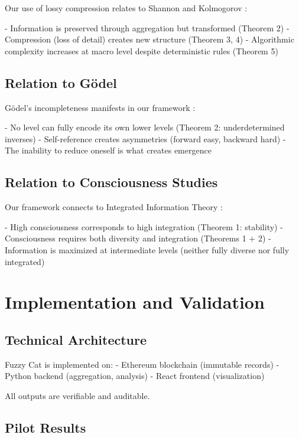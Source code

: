 \documentclass[12pt,a4paper]{article}
\theoremstyle{definition}
\begin{document}
{Our use of lossy compression relates to Shannon and Kolmogorov \citep{shannon1948mathematical, kolmogorov1965three}:

- Information is preserved through aggregation but transformed (Theorem 2)
- Compression (loss of detail) creates new structure (Theorem 3, 4)
- Algorithmic complexity increases at macro level despite deterministic rules (Theorem 5)

\subsection{Relation to Gödel}

Gödel's incompleteness manifests in our framework \citep{godel1931}:

- No level can fully encode its own lower levels (Theorem 2: underdetermined inverses)
- Self-reference creates asymmetries (forward easy, backward hard)
- The inability to reduce oneself is what creates emergence

\subsection{Relation to Consciousness Studies}

Our framework connects to Integrated Information Theory \citep{tononi2012integrated}:

- High consciousness corresponds to high integration (Theorem 1: stability)
- Consciousness requires both diversity and integration (Theorems 1 + 2)
- Information is maximized at intermediate levels (neither fully diverse nor fully integrated)

\section{Implementation and Validation}

\subsection{Technical Architecture}

Fuzzy Cat is implemented on:
- Ethereum blockchain (immutable records)
- Python backend (aggregation, analysis)
- React frontend (visualization)

All outputs are verifiable and auditable.

\subsection{Pilot Results}

}
\end{document}
